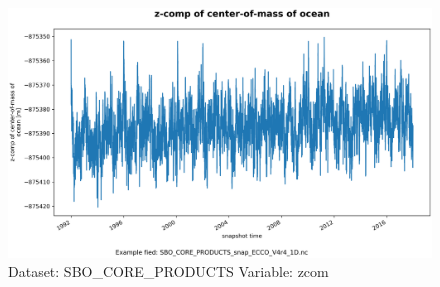 \begin{figure}[H]
\centering
\includegraphics[scale=0.55]{../images/plots/oneD_plots/SBO_Core_Products/zcom.png}
\caption{Dataset: SBO\_CORE\_PRODUCTS Variable: zcom}
\label{tab:table-SBO_CORE_PRODUCTS_zcom-Plot}
\end{figure}
\pagebreak
